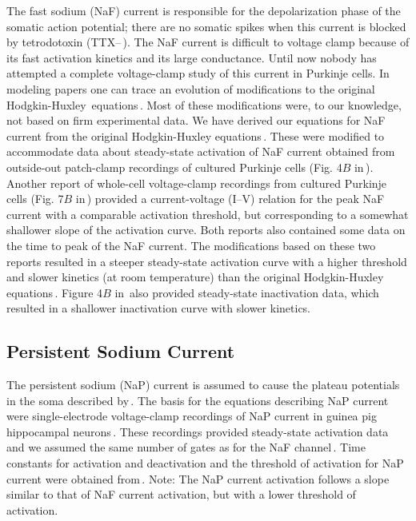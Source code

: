 \documentclass[12pt]{article}
\begin{document}
The fast sodium (NaF) current is responsible for the depolarization phase of the somatic action potential; there are no somatic spikes when this current is blocked by tetrodotoxin (TTX--\,\cite{R:1980ly}). The NaF current is difficult to voltage clamp because of its fast activation kinetics and its large conductance. Until now nobody has attempted a complete voltage-clamp study of this current in Purkinje cells. In modeling papers one can trace an evolution of modifications to the original Hodgkin-Huxley\,\cite{hodgkin52:_quantitative_description} equations\,\cite{W:1991qa, D:1982lh, Wilson:1989ff}. Most of these modifications were, to our knowledge, not based on firm experimental data. We have derived our equations for NaF current from the original Hodgkin-Huxley equations\,\cite{hodgkin52:_quantitative_description}. These were modified to accommodate data about steady-state activation of NaF current obtained from outside-out patch-clamp recordings of cultured Purkinje cells (Fig. 4$B$ in\,\cite{Gahwiler:1989fk}). Another report of whole-cell voltage-clamp recordings from cultured Purkinje cells (Fig. 7$B$ in\,\cite{Hirano:1989uq}) provided a current-voltage (I--V) relation for the peak NaF current with a comparable activation threshold, but corresponding to a somewhat shallower slope of the activation curve. Both reports also contained some data on the time to peak of the NaF current. The modifications based on these two reports resulted in a steeper steady-state activation curve with a higher threshold and slower kinetics (at room temperature) than the original Hodgkin-Huxley equations\,\cite{hodgkin52:_quantitative_description}. Figure 4$B$ in\,\cite{Gahwiler:1989fk} also provided steady-state inactivation data, which resulted in a shallower inactivation curve with slower kinetics.

\subsection*{Persistent Sodium Current}
The persistent sodium (NaP) current is assumed to cause the plateau potentials in the soma described by\,\cite{R:1980ly}. The basis for the equations describing NaP current were single-electrode voltage-clamp recordings of NaP current in guinea pig hippocampal neurons\,\cite{C-R-French:1990uq}. These recordings provided steady-state activation data and we assumed the same number of gates as for the NaF channel\,\cite{hodgkin52:_quantitative_description}. Time constants for activation and deactivation and the threshold of activation for NaP current were obtained from\,\cite{Kay:1990kx}. Note: The NaP current activation follows a slope similar to that of NaF current activation, but with a lower threshold of activation.



\end{document}
